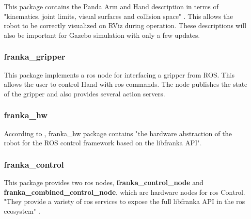 This package contains the Panda Arm and Hand description in terms of "kinematics, joint limits, visual surfaces and collision space" \cite{FrankaEmikaGmbH_fci_documentation}. This allows the robot to be correctly visualized on RViz during operation. These descriptions will also be important for Gazebo simulation with only a few updates.


\subsubsection*{franka\_gripper}
\label{subsubsec:ros_setup_robotic_system_integration_ros_franka_ros_franka_gripper}

This package implements a \gls{ros} node for interfacing a gripper from \gls{ROS}. This allows the user to control Hand with \gls{ros} commands. The node publishes the state of the gripper and also provides several action servers.


\subsubsection*{franka\_hw}
\label{subsubsec:ros_setup_robotic_system_integration_ros_franka_ros_franka_hw}

According to \cite{FrankaEmikaGmbH_fci_documentation}, franka\_hw package contains "the hardware abstraction of the robot for the ROS control framework based on the libfranka API".


\subsubsection*{franka\_control}
\label{subsubsec:ros_setup_robotic_system_integration_ros_franka_ros_franka_control}

This package provides two \gls{ros} nodes, \textbf{franka\_control\_node} and \textbf{franka\_combined\_control\_node}, which are hardware nodes for \gls{ros} Control. "They provide a variety of \gls{ros} services to expose the full libfranka API in the \gls{ros} ecosystem" \cite{FrankaEmikaGmbH_fci_documentation}. 


